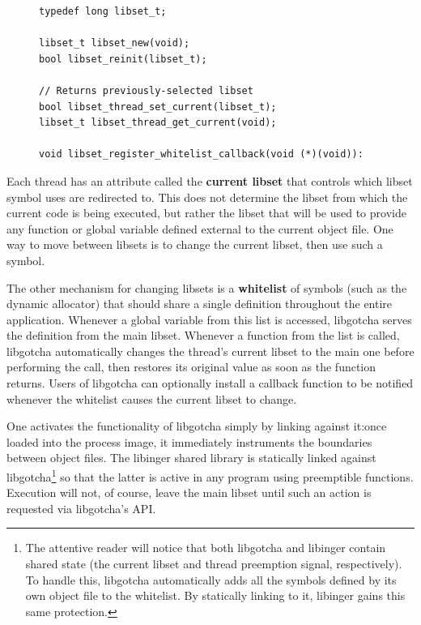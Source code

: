 \begin{figure}
\begin{lstlisting}[label=lst:gotchaapi,caption=libgotcha C interface]
typedef long libset_t;

libset_t libset_new(void);
bool libset_reinit(libset_t);

// Returns previously-selected libset
bool libset_thread_set_current(libset_t);
libset_t libset_thread_get_current(void);

void libset_register_whitelist_callback(void (*)(void)):
\end{lstlisting}
\end{figure}

Each thread has an attribute called the \textbf{current libset} that controls which
libset symbol uses are redirected to.  This does not determine the libset from which
the current code is being executed, but rather the libset that will be used to
provide any function or global variable defined external to the current object file.
One way to move between libsets is to change the current libset, then use such a
symbol.

The other mechanism for changing libsets is a \textbf{whitelist} of symbols (such as
the dynamic allocator) that should share a single definition throughout the entire
application.  Whenever a global variable from this list is accessed, libgotcha serves
the definition from the main libset.  Whenever a function from the list is called,
libgotcha automatically changes the thread's current libset to the main one before
performing the call, then restores its original value as soon as the function
returns.  Users of libgotcha can optionally install a callback function to be
notified whenever the whitelist causes the current libset to change.

One activates the functionality of libgotcha simply by linking against it:\@ once
loaded into the process image, it immediately instruments the boundaries between
object files.  The libinger shared library is statically linked against
libgotcha\footnote{The attentive reader will notice that both libgotcha and libinger
contain shared state (the current libset and thread preemption signal, respectively).
To handle this, libgotcha automatically adds all the symbols defined by its own
object file to the whitelist.  By statically linking to it, libinger gains this same
protection.} so that the latter is active in any program using preemptible functions.
Execution will not, of course, leave the main libset until such an action is
requested via libgotcha's API.

